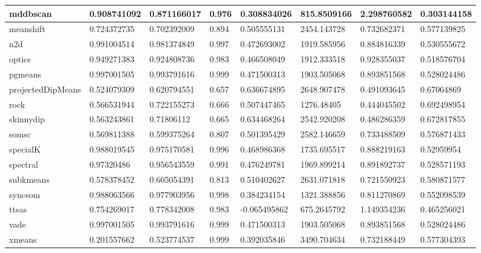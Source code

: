 \begin{table}[H]
\begin{tabular}{|l|l|l|l|l|l|l|l|}
\hline
mddbscan & 0.908741092 & 0.871166017 & 0.976 & 0.308834026 & 815.8509166 & 2.298760582 & 0.303144158 \\
\hline
meanshift & 0.724372735 & 0.702392009 & 0.894 & 0.505555131 & 2454.143728 & 0.732682371 & 0.577139825 \\
\hline
n2d & 0.991004514 & 0.981374849 & 0.997 & 0.472693002 & 1919.585956 & 0.884816339 & 0.530555672 \\
\hline
optics & 0.949271383 & 0.924808736 & 0.983 & 0.466508049 & 1912.333518 & 0.928355037 & 0.518576704 \\
\hline
pgmeans & 0.997001505 & 0.993791616 & 0.999 & 0.471500313 & 1903.505068 & 0.893851568 & 0.528024486 \\
\hline
projectedDipMeans & 0.524079309 & 0.620794551 & 0.657 & 0.636674895 & 2648.907478 & 0.491093645 & 0.67064869 \\
\hline
rock & 0.566531944 & 0.722155273 & 0.666 & 0.507447465 & 1276.48405 & 0.444045502 & 0.692498954 \\
\hline
skinnydip & 0.563243861 & 0.71806112 & 0.665 & 0.634468264 & 2542.920208 & 0.486286359 & 0.672817855 \\
\hline
somsc & 0.569811388 & 0.599375264 & 0.807 & 0.501395429 & 2582.146659 & 0.733488509 & 0.576871433 \\
\hline
specialK & 0.988019545 & 0.975170581 & 0.996 & 0.468986368 & 1735.695517 & 0.888219163 & 0.52959954 \\
\hline
spectral & 0.97320486 & 0.956543559 & 0.991 & 0.476249781 & 1969.899214 & 0.891892737 & 0.528571193 \\
\hline
subkmeans & 0.578378452 & 0.605054391 & 0.813 & 0.510402627 & 2631.071818 & 0.721550923 & 0.580871577 \\
\hline
syncsom & 0.988063566 & 0.977903956 & 0.998 & 0.384234154 & 1321.388856 & 0.811270869 & 0.552098539 \\
\hline
ttsas & 0.754269017 & 0.778342008 & 0.983 & -0.065495862 & 675.2645792 & 1.149354236 & 0.465256021 \\
\hline
vade & 0.997001505 & 0.993791616 & 0.999 & 0.471500313 & 1903.505068 & 0.893851568 & 0.528024486 \\
\hline
xmeans & 0.201557662 & 0.523774537 & 0.999 & 0.392035846 & 3490.704634 & 0.732188449 & 0.577304393 \\
\hline
\end{tabular}
\end{table}

\clearpage

